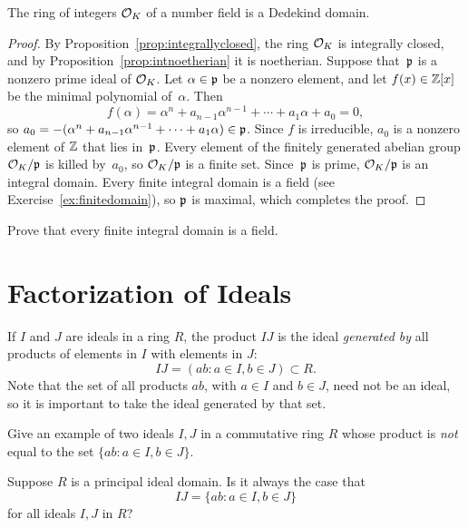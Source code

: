 \begin{proposition}
	The ring of integers $\mathcal{O}_K$ of a number field is a Dedekind domain.
\end{proposition}
\begin{proof}
	By Proposition~\ref{prop:integrallyclosed}, the ring $\mathcal{O}_K$ is
	integrally closed, and by Proposition~\ref{prop:intnoetherian} it is
	noetherian.  Suppose that~$\mathfrak{p}$ is a nonzero prime ideal of $\mathcal{O}_K$.
	Let $\alpha\in \mathfrak{p}$ be a nonzero element, and let $f(x)\in\mathbb{Z}[x]$ be the
	minimal polynomial of~$\alpha$.  Then
	$$f(\alpha)=\alpha^n+a_{n-1}\alpha^{n-1}+\cdots+a_1\alpha+a_0=0,$$ so
	$a_0 = -(\alpha^n+a_{n-1}\alpha^{n-1}+\cdots+a_1\alpha)\in \mathfrak{p}$.  Since
	$f$ is irreducible, $a_0$ is a nonzero element of $\mathbb{Z}$ that lies
	in~$\mathfrak{p}$.  Every element of the finitely generated abelian group
	$\mathcal{O}_K/\mathfrak{p}$ is killed by~$a_0$, so $\mathcal{O}_K/\mathfrak{p}$ is a finite set.
	Since~$\mathfrak{p}$ is prime, $\mathcal{O}_K/\mathfrak{p}$ is an integral domain.  Every finite
	integral domain is a field (see Exercise~\ref{ex:finitedomain}), so
	$\mathfrak{p}$ is maximal, which completes the proof.
\end{proof}

\begin{exercise}\label{ex:finitedomain}
	Prove that every finite integral domain is a field.
\end{exercise}

\section{Factorization of Ideals}

If $I$ and $J$ are ideals in a ring $R$, the product $IJ$ is the ideal
{\em generated by} all products of elements in $I$ with elements in $J$:
$$
	IJ = (ab : a\in I, b\in J) \subset R.
$$
Note that the set of all products $ab$, with $a\in I$ and $b\in J$,
need not be an ideal, so it is important to take the ideal generated
by that set.

\begin{exercise}\label{ex:idealprod}
	Give an example of two ideals $I, J$ in a commutative
	ring $R$ whose product is {\em not} equal to the set
	$\{ab : a \in I, b \in J\}$. 
\end{exercise}

\begin{exercise}\label{ex:idealprod2}
	Suppose $R$ is a principal ideal domain. Is it always the case that 
	$$
		IJ = \{ab : a \in I, b \in J\}
	$$
	for all ideals $I, J$ in $R$?
\end{exercise}


